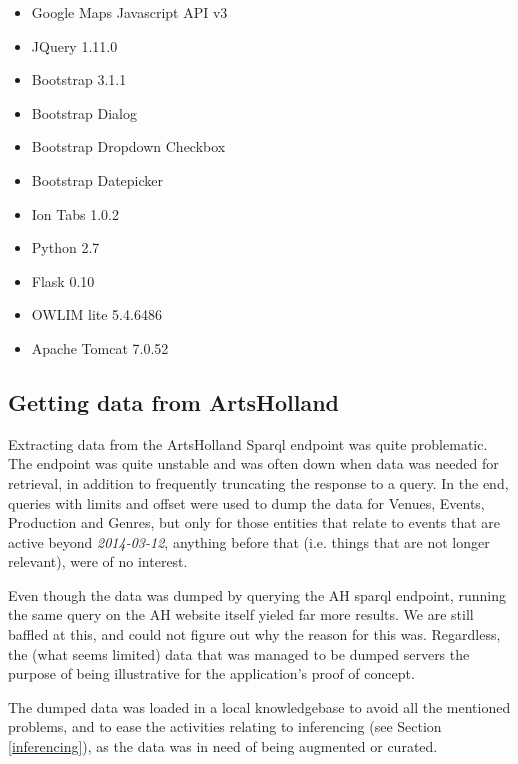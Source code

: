 \documentclass[hidelinks,a4paper]{article}
\begin{document}
\begin{itemize}
  \item Google Maps Javascript API v3 \cite{gmapsv3}
  \item JQuery 1.11.0 \cite{jquery}
  \item Bootstrap 3.1.1 \cite{bootstrap}
  \item Bootstrap Dialog \cite{bootstrap-dialog}
  \item Bootstrap Dropdown Checkbox \cite{bootstrap-dropdown-checkbox}
  \item Bootstrap Datepicker \cite{bootstrap-datepicker}
  \item Ion Tabs 1.0.2 \cite{ion-tabs}
  \item Python 2.7 \cite{python}
  \item Flask 0.10 \cite{flask}
  \item OWLIM lite 5.4.6486 \cite{owlim}
  \item Apache Tomcat 7.0.52 \cite{tomcat}
\end{itemize}

\subsection{Getting data from ArtsHolland}
Extracting data from the ArtsHolland Sparql endpoint \cite{artsholland_sparql} was quite problematic. The endpoint was quite unstable and was often down when data was needed for retrieval, in addition to frequently truncating the response to a query. In the end, queries with limits and offset were used to dump the data for Venues, Events, Production and Genres, but only for those entities that relate to events that are active beyond \emph{2014-03-12}, anything before that (i.e. things that are not longer relevant), were of no interest. 

Even though the data was dumped by querying the AH sparql endpoint, running the same query on the AH website itself yieled far more results. We are still baffled at this, and could not figure out why the reason for this was. Regardless, the (what seems limited) data that was managed to be dumped servers the purpose of being illustrative for the application's proof of concept.

The dumped data was loaded in a local knowledgebase to avoid all the mentioned  problems, and to ease the activities relating to inferencing (see Section \ref{inferencing}), as the data was in need of being augmented or curated.
\end{document}
